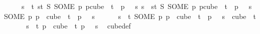 \begin{isabellebody}
\ \ \ \ \ {\isachardoublequoteopen}{\isasymforall}s\ {\isasymin}\ {\isacharbraceleft}{\kern0pt}{\isachardot}{\kern0pt}{\isachardot}{\kern0pt}{\isacharless}{\kern0pt}t{\isacharbraceright}{\kern0pt}{\isachardot}{\kern0pt}\ {\isacharparenleft}{\kern0pt}{\isasymlambda}s{\isasymin}{\isacharbraceleft}{\kern0pt}{\isachardot}{\kern0pt}{\isachardot}{\kern0pt}{\isacharless}{\kern0pt}t{\isacharbraceright}{\kern0pt}{\isachardot}{\kern0pt}\ S\ {\isacharparenleft}{\kern0pt}SOME\ p{\isachardot}{\kern0pt}\ p{\isasymin}cube\ {}\ t\ {\isasymand}\ p\ {}\ {\isacharequal}{\kern0pt}\ s{\isacharparenright}{\kern0pt}{\isacharparenright}{\kern0pt}\ s\ {\isacharequal}{\kern0pt}\ {\isacharparenleft}{\kern0pt}{\isasymlambda}s{\isasymin}{\isacharbraceleft}{\kern0pt}{\isachardot}{\kern0pt}{\isachardot}{\kern0pt}{\isacharless}{\kern0pt}t{\isacharbraceright}{\kern0pt}{\isachardot}{\kern0pt}\ S\ {\isacharparenleft}{\kern0pt}SOME\ p{\isachardot}{\kern0pt}\ p{\isasymin}cube\ {}\ t\ {\isasymand}\ p\ {}\ {\isacharequal}{\kern0pt}\ s{\isacharparenright}{\kern0pt}{\isacharparenright}{\kern0pt}\ {\isacharparenleft}{\kern0pt}{\isacharparenleft}{\kern0pt}SOME\ p{\isachardot}{\kern0pt}\ p\ {\isasymin}\ cube\ {}\ t\ {\isasymand}\ p\ {}\ {\isacharequal}{\kern0pt}\ s{\isacharparenright}{\kern0pt}\ {}{\isacharparenright}{\kern0pt}{\isachardoublequoteclose}\isanewline
\ \ \ \ \ {\isachardoublequoteopen}{\isasymforall}s\ {\isasymin}\ {\isacharbraceleft}{\kern0pt}{\isachardot}{\kern0pt}{\isachardot}{\kern0pt}{\isacharless}{\kern0pt}t{\isacharbraceright}{\kern0pt}{\isachardot}{\kern0pt}\ {\isacharparenleft}{\kern0pt}SOME\ p{\isachardot}{\kern0pt}\ p\ {\isasymin}\ cube\ {}\ t\ {\isasymand}\ p\ {}\ {\isacharequal}{\kern0pt}\ s{\isacharparenright}{\kern0pt}\ {\isasymin}\ cube\ {}\ t{\isachardoublequoteclose}\isanewline
%
\isadelimproof
%
\endisadelimproof
%
\isatagproof
{}\isamarkupfalse%
\ {\isacharminus}{\kern0pt}\isanewline
\ \ \isamarkupfalse%
\ {}{\isacharcolon}{\kern0pt}\ {\isachardoublequoteopen}{\isasymforall}s\ {\isasymin}\ {\isacharbraceleft}{\kern0pt}{\isachardot}{\kern0pt}{\isachardot}{\kern0pt}{\isacharless}{\kern0pt}t{\isacharbraceright}{\kern0pt}{\isachardot}{\kern0pt}\ {\isasymexists}p\ {\isasymin}\ cube\ {}\ t{\isachardot}{\kern0pt}\ p\ {}\ {\isacharequal}{\kern0pt}\ s{\isachardoublequoteclose}\ \isamarkupfalse%
\ cube{\isacharunderscore}{\kern0pt}def\ \isamarkupfalse%

\end{isabellebody}
